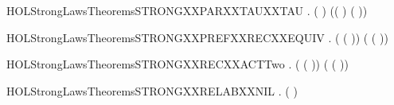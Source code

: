 \newcommand{\HOLStrongLawsTheoremsSTRONGXXPARXXTAUXXPREF}{\UseVerbatim{HOLStrongLawsTheoremsSTRONGXXPARXXTAUXXPREF}}
\begin{SaveVerbatim}{HOLStrongLawsTheoremsSTRONGXXPARXXTAUXXTAU}
\HOLTokenTurnstile{} \HOLSymConst{\HOLTokenForall{}} .
        (\HOLConst{\ensuremath{\tau}} \HOLSymConst{\ensuremath{\parallel}} \HOLConst{\ensuremath{\tau}})
         (\HOLConst{\ensuremath{\tau}}( \HOLSymConst{\ensuremath{\parallel}} \HOLConst{\ensuremath{\tau}}) \HOLSymConst{+} \HOLConst{\ensuremath{\tau}}(\HOLConst{\ensuremath{\tau}} \HOLSymConst{\ensuremath{\parallel}} ))
\end{SaveVerbatim}
\newcommand{\HOLStrongLawsTheoremsSTRONGXXPARXXTAUXXTAU}{\UseVerbatim{HOLStrongLawsTheoremsSTRONGXXPARXXTAUXXTAU}}
\begin{SaveVerbatim}{HOLStrongLawsTheoremsSTRONGXXPREFXXRECXXEQUIV}
\HOLTokenTurnstile{} \HOLSymConst{\HOLTokenForall{}}  .
        (  ( ))
         (  ( ))
\end{SaveVerbatim}
\newcommand{\HOLStrongLawsTheoremsSTRONGXXPREFXXRECXXEQUIV}{\UseVerbatim{HOLStrongLawsTheoremsSTRONGXXPREFXXRECXXEQUIV}}
\begin{SaveVerbatim}{HOLStrongLawsTheoremsSTRONGXXRECXXACTTwo}
\HOLTokenTurnstile{} \HOLSymConst{\HOLTokenForall{}} .  (  ( )) (  ( ))
\end{SaveVerbatim}
\newcommand{\HOLStrongLawsTheoremsSTRONGXXRECXXACTTwo}{\UseVerbatim{HOLStrongLawsTheoremsSTRONGXXRECXXACTTwo}}
\begin{SaveVerbatim}{HOLStrongLawsTheoremsSTRONGXXRELABXXNIL}
\HOLTokenTurnstile{} \HOLSymConst{\HOLTokenForall{}}.  (  ) 
\end{SaveVerbatim}
